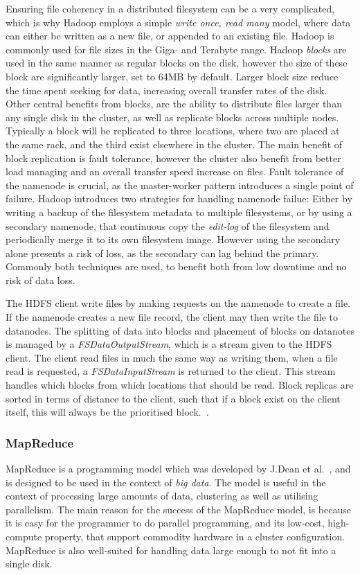 Ensuring file coherency in a distributed filesystem can be a very complicated, which is why Hadoop employs a simple \emph{write once, read many} model, where data can either be written as a new file, or appended to an existing file. Hadoop is commonly used for file sizes in the Giga- and Terabyte range. Hadoop \emph{blocks} are used in the same manner as regular blocks on the disk, however the size of these block are significantly larger, set to 64MB by default. Larger block size reduce the time spent seeking for data, increasing overall transfer rates of the disk. Other central benefits from blocks, are the ability to distribute files larger than any single disk in the cluster, as well as replicate blocks across multiple nodes. Typically a block will be replicated to three locations, where two are placed at the same rack, and the third exist elsewhere in the cluster. The main benefit of block replication is fault tolerance, however the cluster also benefit from better load managing and an overall transfer speed increase on files. Fault tolerance of the namenode is crucial, as the master-worker pattern introduces a single point of failure. Hadoop introduces two strategies for handling namenode failue: Either by writing a backup of the filesystem metadata to multiple filesystems, or by using a secondary namenode, that continuous copy the \emph{edit-log} of the filesystem and periodically merge it to its own filesystem image. However using the secondary alone presents a risk of loss, as the secondary can lag behind the primary. Commonly both techniques are used, to benefit both from low downtime and no risk of data loss.

The HDFS client write files by making requests on the namenode to create a file. If the namenode creates a new file record, the client may then write the file to datanodes. The splitting of data into blocks and placement of blocks on datanotes is managed by a \emph{FSDataOutputStream}, which is a stream given to the HDFS client. The client read files in much the same way as writing them, when a file read is requested, a \emph{FSDataInputStream} is returned to the client. This stream handles which blocks from which locations that should be read. Block replicas are sorted in terms of distance to the client, such that if a block exist on the client itself, this will always be the prioritised block.~\cite{hadoopIntro}.

\subsubsection{MapReduce}\label{sec:mapreduce_programming_model}
MapReduce is a programming model which was developed by J.\@ Dean et al.~\cite{DeanMapReduce}, and is designed to be used in the context of \emph{big data}. The model is useful in the context of processing large amounts of data, clustering as well as utilising parallelism. The main reason for the success of the MapReduce model, is because it is easy for the programmer to do parallel programming, and its low-cost, high-compute property, that support commodity hardware in a cluster configuration. MapReduce is also well-suited for handling data large enough to not fit into a single disk.

